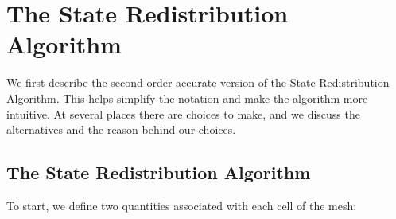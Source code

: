 \section{The State Redistribution Algorithm}\label{sec:srdAlg}

We first describe the second order accurate version of the State
Redistribution Algorithm. 
This helps simplify the notation and make the
algorithm more intuitive.   
At several places there are choices
to make, and we discuss the alternatives and the reason behind our
choices.  

\subsection{The State Redistribution Algorithm}

To start, we define two quantities associated with each cell of the mesh:


